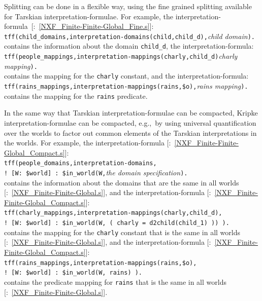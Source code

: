 \documentclass{ceurart}
\newcommand{\smalltt}[1]{\small \texttt{#1}}
\newcommand{\example}{{\scriptsize \faFile[regular]}}
\begin{document}
Splitting can be done in a flexible way, using the fine grained splitting available for
Tarskian interpretation-formulae.
For example, the interpretation-formula~[\example{}:~\ref{NXF_Finite-Finite-Global_Fine.s}]: \\
\hspace*{0.5cm}\smalltt{tff(child\_domains,interpretation-domains(child,child\_d),}\emph{child domain}\smalltt{).} \\
contains the information about the domain \smalltt{child\_d}, the interpretation-formula: \\
\hspace*{0.5cm}\smalltt{tff(people\_mappings,interpretation-mappings(charly,child\_d)}\emph{charly mapping}\smalltt{).} \\
contains the mapping for the \smalltt{charly} constant, and the interpretation-formula: \\
\hspace*{0.5cm}\smalltt{tff(rains\_mappings,interpretation-mappings(rains,\$o),}\emph{rains mapping}\smalltt{).} \\
contains the mapping for the \smalltt{rains} predicate.

In the same way that Tarskian interpretation-formulae can be compacted, Kripke
interpretation-formulae can be compacted, e.g.,~by using universal quantification over the
worlds to factor out common elements of the Tarskian interpretations in the worlds.
For example, the interpretation-formula [\example{}:~\ref{NXF_Finite-Finite-Global_Compact.s}]: \\
\hspace*{0.5cm}\smalltt{tff(people\_domains,interpretation-domains,} \\
\hspace*{0.9cm}\smalltt{! [W: \$world] : \$in\_world(W,}\emph{the domain specification}\smalltt{).} \\
contains the information about the domains that are the same in all worlds 
[\example{}:~\ref{NXF_Finite-Finite-Global.s}], and the interpretation-formula
[\example{}:~\ref{NXF_Finite-Finite-Global_Compact.s}]: \\
\hspace*{0.5cm}\smalltt{tff(charly\_mappings,interpretation-mappings(charly,child\_d),}\\
\hspace*{0.9cm}\smalltt{! [W: \$world] : \$in\_world(W, ( charly = d2child(child\_1) )) ).} \\
contains the mapping for the \smalltt{charly} constant that is the same in all worlds
[\example{}:~\ref{NXF_Finite-Finite-Global.s}], and the interpretation-formula
[\example{}:~\ref{NXF_Finite-Finite-Global_Compact.s}]: \\
\hspace*{0.5cm}\smalltt{tff(rains\_mappings,interpretation-mappings(rains,\$o),} \\
\hspace*{0.9cm}\smalltt{! [W: \$world] : \$in\_world(W, rains) ).} \\
contains the predicate mapping for \smalltt{rains} that is the same in all worlds
[\example{}:~\ref{NXF_Finite-Finite-Global.s}].
\end{document}
